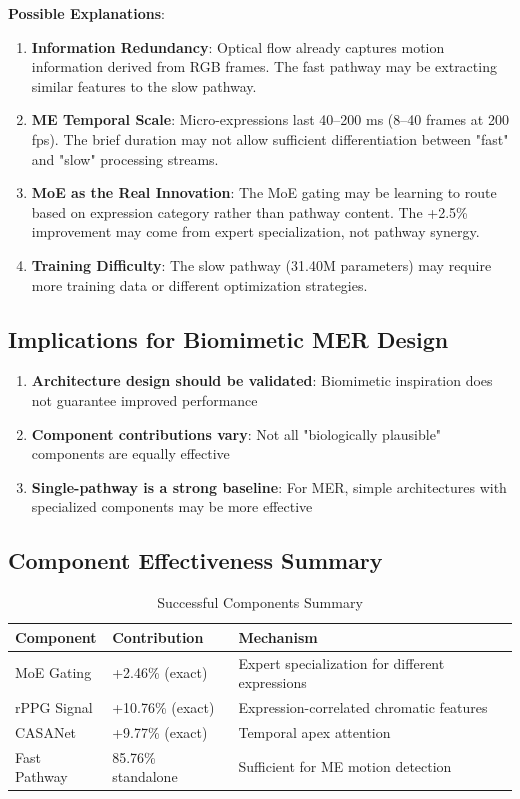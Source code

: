 \documentclass[preprint,12pt,authoryear]{elsarticle}
\begin{document}
\textbf{Possible Explanations}:

\begin{enumerate}
\item \textbf{Information Redundancy}: Optical flow already captures motion information derived from RGB frames. The fast pathway may be extracting similar features to the slow pathway.

\item \textbf{ME Temporal Scale}: Micro-expressions last 40--200 ms (8--40 frames at 200 fps). The brief duration may not allow sufficient differentiation between "fast" and "slow" processing streams.

\item \textbf{MoE as the Real Innovation}: The MoE gating may be learning to route based on expression category rather than pathway content. The +2.5\% improvement may come from expert specialization, not pathway synergy.

\item \textbf{Training Difficulty}: The slow pathway (31.40M parameters) may require more training data or different optimization strategies.
\end{enumerate}

\subsection{Implications for Biomimetic MER Design}

\begin{enumerate}
\item \textbf{Architecture design should be validated}: Biomimetic inspiration does not guarantee improved performance
\item \textbf{Component contributions vary}: Not all "biologically plausible" components are equally effective
\item \textbf{Single-pathway is a strong baseline}: For MER, simple architectures with specialized components may be more effective
\end{enumerate}

\subsection{Component Effectiveness Summary}

\begin{table}[htbp]
\centering
\caption{Successful Components Summary}
\label{tab:components}
\begin{tabular}{lll}
\toprule
\textbf{Component} & \textbf{Contribution} & \textbf{Mechanism} \\
\midrule
MoE Gating & +2.46\% (exact) & Expert specialization for different expressions \\
rPPG Signal & +10.76\% (exact) & Expression-correlated chromatic features \\
CASANet & +9.77\% (exact) & Temporal apex attention \\
Fast Pathway & 85.76\% standalone & Sufficient for ME motion detection \\
\bottomrule
\end{tabular}
\end{table}
\end{document}
